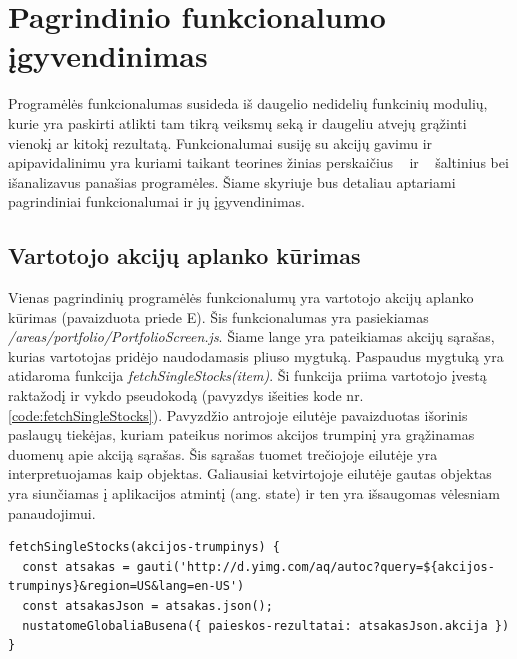 \documentclass[a4paper,12pt,fleqn]{article}
\begin{document}
\newpage
\section{Pagrindinio funkcionalumo įgyvendinimas}
Programėlės funkcionalumas susideda iš daugelio nedidelių funkcinių modulių, kurie yra paskirti atlikti tam tikrą veiksmų seką ir daugeliu atvejų grąžinti vienokį ar kitokį rezultatą. Funkcionalumai susiję su akcijų gavimu ir apipavidalinimu yra kuriami taikant teorines žinias perskaičius ~\cite{IGR} ir ~\cite{JOA} šaltinius bei išanalizavus panašias programėles. Šiame skyriuje bus detaliau aptariami pagrindiniai funkcionalumai ir jų įgyvendinimas.
\subsection{Vartotojo akcijų aplanko kūrimas}
Vienas pagrindinių programėlės funkcionalumų yra vartotojo akcijų aplanko kūrimas (pavaizduota priede E). Šis funkcionalumas yra pasiekiamas \textit{/areas/portfolio/PortfolioScreen.js}. Šiame lange yra pateikiamas akcijų sąrašas, kurias vartotojas pridėjo naudodamasis pliuso mygtuką. Paspaudus mygtuką yra atidaroma funkcija \textit{fetchSingleStocks(item)}. Ši funkcija priima vartotojo įvestą raktažodį ir vykdo pseudokodą (pavyzdys išeities kode nr. \ref{code:fetchSingleStocks}). Pavyzdžio antrojoje eilutėje pavaizduotas išorinis paslaugų tiekėjas, kuriam pateikus norimos akcijos trumpinį yra grąžinamas duomenų apie akciją sąrašas. Šis sąrašas tuomet trečiojoje eilutėje yra interpretuojamas kaip objektas. Galiausiai ketvirtojoje eilutėje gautas objektas yra siunčiamas į aplikacijos atmintį (ang. state) ir ten yra išsaugomas vėlesniam panaudojimui.
\begin{lstlisting}[caption={Funkcijos fetchSingleStocks() pseudokodas.},label={code:fetchSingleStocks}]
fetchSingleStocks(akcijos-trumpinys) {
  const atsakas = gauti('http://d.yimg.com/aq/autoc?query=${akcijos-trumpinys}&region=US&lang=en-US')
  const atsakasJson = atsakas.json();
  nustatomeGlobaliaBusena({ paieskos-rezultatai: atsakasJson.akcija })	
}
\end{lstlisting}
\end{document}
